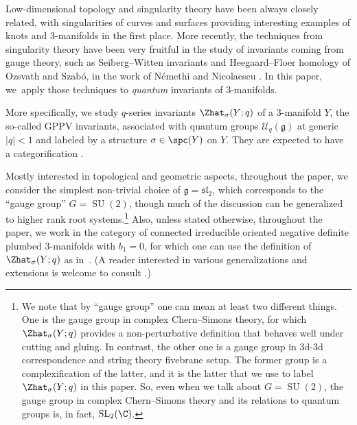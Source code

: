 \documentclass[pdftex]{sigma}
\begin{document}
Low-dimensional topology and singularity theory have been always closely related, with singularities of curves and surfaces providing interesting examples of knots and 3-manifolds in the first place. More recently, the techniques from singularity theory have been very fruitful in the study of invariants coming from gauge theory, such as Seiberg--Witten invariants and Heegaard--Floer homology of Ozsvath and Szab\'o, in the work of N\'emethi and Nicolaescu \cite{NeNi02}. In this paper, we~apply those techniques to \emph{quantum} invariants of 3-manifolds.

More specifically, we study $q$-series invariants $\Zhat_{\sigma}(Y; q)$ of a 3-manifold $Y$, the so-called GPPV invariants, associated with quantum groups $\mathcal{U}_q (\mathfrak{g})$ at generic $|q|<1$ and labeled by a \spc{} structure $\sigma \in \spc(Y)$ on $Y$. They are expected to have a categorification \cite{GPV16}.

Mostly interested in topological and geometric aspects, throughout the paper, we consider the simplest non-trivial choice of $\mathfrak{g} = \mathfrak{sl}_2$, which corresponds to the ``gauge group'' $G = \operatorname{SU}(2)$, though much of the discussion can be generalized to higher rank root systems.\footnote{We note that by ``gauge group'' one can mean at least two different things. One is the gauge group in complex Chern--Simons theory, for which $\Zhat_{\sigma}(Y; q)$ provides a non-perturbative definition that behaves well under cutting and gluing. In contrast, the other one is a gauge group in 3d-3d correspondence and string theory fivebrane setup. The former group is a complexification of the latter, and it is the latter that we use to label $\Zhat_{\sigma}(Y; q)$ in this paper. So, even when we talk about $G = \operatorname{SU}(2)$, the gauge group in complex Chern--Simons theory and its relations to quantum groups is, in fact, $\operatorname{SL}_2(\C)$.} Also, unless stated otherwise, throughout the paper, we work in the category of connected irreducible oriented negative definite plumbed 3-manifolds \cite{Neu81} with $b_1 = 0$, for which one can use the definition of~$\Zhat_{\sigma}(Y; q)$ as in~\cite{GPPV20}. (A reader interested in various generalizations and extensions is welcome to consult \cite{AJK21,Chae21, GM21, Pa20a, Pa20b, Pa21, Ri22}.)
\end{document}
